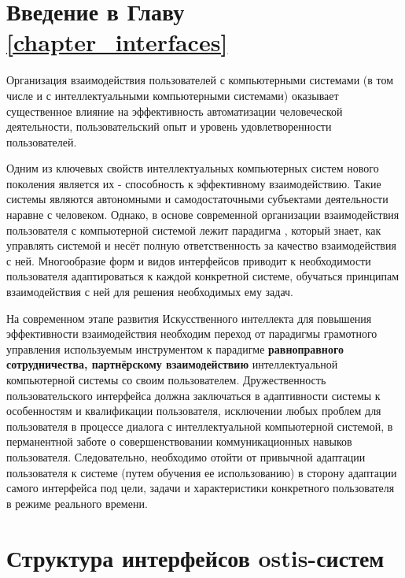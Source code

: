 \section*{Введение в Главу \ref{chapter_interfaces}}

Организация взаимодействия пользователей с компьютерными системами (в том числе и с интеллектуальными компьютерными системами) оказывает существенное влияние на эффективность автоматизации человеческой деятельности, пользовательский опыт и уровень удовлетворенности пользователей. 

Одним из ключевых свойств интеллектуальных компьютерных систем нового поколения является их  - способность к эффективному взаимодействию. Такие системы являются автономными и самодостаточными субъектами деятельности наравне с человеком. Однако, в основе современной организации взаимодействия пользователя с компьютерной системой лежит парадигма , который знает, как управлять системой и несёт полную ответственность за качество взаимодействия с ней. Многообразие форм и видов интерфейсов приводит к необходимости пользователя  адаптироваться к каждой конкретной системе, обучаться принципам взаимодействия с ней для решения необходимых ему задач.

На современном этапе развития Искусственного интеллекта для повышения эффективности взаимодействия необходим переход от парадигмы грамотного управления используемым инструментом к парадигме \textbf{равноправного сотрудничества, партнёрскому взаимодействию}  интеллектуальной компьютерной системы со своим пользователем. Дружественность пользовательского интерфейса должна заключаться в адаптивности системы к особенностям и квалификации пользователя, исключении любых проблем для пользователя в процессе диалога с интеллектуальной компьютерной системой, в перманентной заботе о совершенствовании коммуникационных навыков пользователя. Следовательно, необходимо отойти от привычной адаптации пользователя к системе (путем обучения ее использованию) в сторону адаптации самого интерфейса под цели, задачи и характеристики конкретного пользователя в режиме реального времени. \cite{fomina}


\section{Структура интерфейсов ostis-систем}
\label{sec_interfaces_structure}

\begin{SCn}
\end{SCn}

